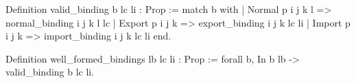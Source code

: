 Definition valid_binding b lc li : Prop :=
  match b with
   | Normal p i j k l => normal_binding i j k l lc
   | Export p i j k   => export_binding i j k lc li       
   | Import p i j k   => import_binding i j k lc li
  end. 

Definition well_formed_bindings lb lc li : Prop :=
  forall b, In b lb -> valid_binding b lc li.